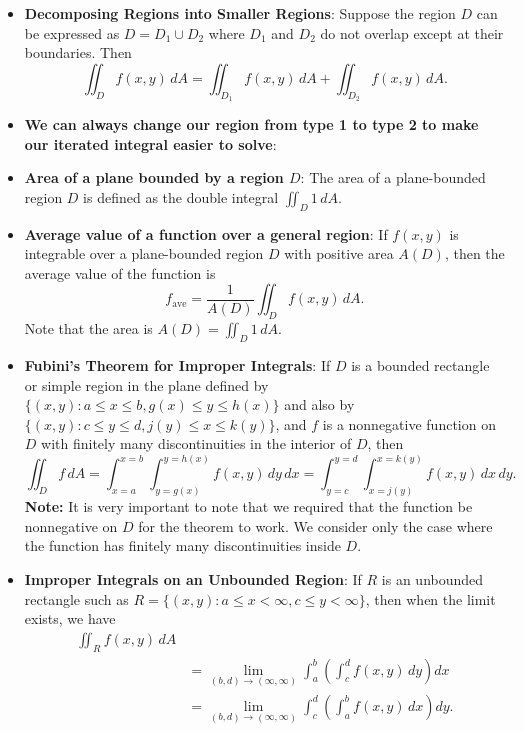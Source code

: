 \documentclass{report}
\begin{document}
\begin{itemize}
\begin{equation}
            \end{equation}
        \item \textbf{Decomposing Regions into Smaller Regions}:
            Suppose the region \(D\) can be expressed as \(D = D_1 \cup D_2\) where \(D_1\) and \(D_2\) do not overlap except at their boundaries. Then
            \[
                \iint_{D} f(x,y) \, dA = \iint_{D_1} f(x,y) \, dA + \iint_{D_2} f(x,y) \, dA.
            \]
        \item \textbf{We can always change our region from type 1 to type 2 to make our iterated integral easier to solve}:
        \item \textbf{Area of a plane bounded by a region $D$}:
            The area of a plane-bounded region \(D\) is defined as the double integral \(\iint_{D} 1 \, dA\).
        \item \textbf{Average value of a function over a general region}:
            If \(f(x,y)\) is integrable over a plane-bounded region \(D\) with positive area \(A(D)\), then the average value of the function is
            \[
                f_{\text{ave}} = \frac{1}{A(D)} \iint_{D} f(x,y) \, dA.
            \]
            Note that the area is \(A(D) = \iint_{D} 1 \, dA\).
        \item \textbf{Fubini’s Theorem for Improper Integrals}:
            If $D$ is a bounded rectangle or simple region in the plane defined by $\{(x,y) : a \leq x \leq b, g(x) \leq y \leq h(x)\}$ and also by $\{(x,y) : c \leq y \leq d, j(y) \leq x \leq k(y)\}$, and $f$ is a nonnegative function on $D$ with finitely many discontinuities in the interior of $D$, then
            \[
                \iint_D f \, dA = \int_{x=a}^{x=b} \int_{y=g(x)}^{y=h(x)} f(x,y) \, dy \, dx = \int_{y=c}^{y=d} \int_{x=j(y)}^{x=k(y)} f(x,y) \, dx \, dy.
            \]
            \bigbreak \noindent 
            \textbf{Note:} It is very important to note that we required that the function be nonnegative on  $D$ for the theorem to work. We consider only the case where the function has finitely many discontinuities inside $D$.
        \item \textbf{Improper Integrals on an Unbounded Region}:
            If $R$ is an unbounded rectangle such as $R = \{(x,y) : a \leq x < \infty, c \leq y < \infty\}$, then when the limit exists, we have
            \begin{align*}
                \iint_R f(x,y) \, dA  &\\
                &= \lim_{(b,d) \to (\infty, \infty)} \int_a^b \left( \int_c^d f(x,y) \, dy \right) dx  \\
                &= \lim_{(b,d) \to (\infty, \infty)} \int_c^d \left( \int_a^b f(x,y) \, dx \right) dy
            .\end{align*}


\end{itemize}
\end{document}
